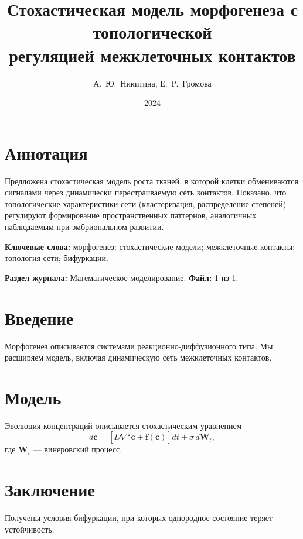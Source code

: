 \documentclass[12pt]{article}
\title{Стохастическая модель морфогенеза с топологической\\ регуляцией межклеточных контактов}
\author{А.~Ю.~Никитина, Е.~Р.~Громова}
\date{2024}
\begin{document}
\maketitle

\section*{Аннотация}
Предложена стохастическая модель роста тканей, в которой клетки обмениваются сигналами через динамически перестраиваемую сеть контактов. Показано, что топологические характеристики сети (кластеризация, распределение степеней) регулируют формирование пространственных паттернов, аналогичных наблюдаемым при эмбриональном развитии.

\vspace{0.5cm}
\noindent\textbf{Ключевые слова:} морфогенез; стохастические модели; межклеточные контакты; топология сети; бифуркации.

\vspace{0.3cm}
\noindent\textbf{Раздел журнала:} Математическое моделирование. \quad \textbf{Файл:} 1 из 1.

\section{Введение}
Морфогенез описывается системами реакционно-диффузионного типа. Мы расширяем модель, включая динамическую сеть межклеточных контактов.

\section{Модель}
Эволюция концентраций описывается стохастическим уравнением
\begin{equation}
d\mathbf{c} = \left[ D \nabla^2 \mathbf{c} + \mathbf{f}(\mathbf{c}) \right] dt + \sigma\, d\mathbf{W}_t,
\end{equation}
где $\mathbf{W}_t$ — винеровский процесс.

\section{Заключение}
Получены условия бифуркации, при которых однородное состояние теряет устойчивость.
\end{document}
